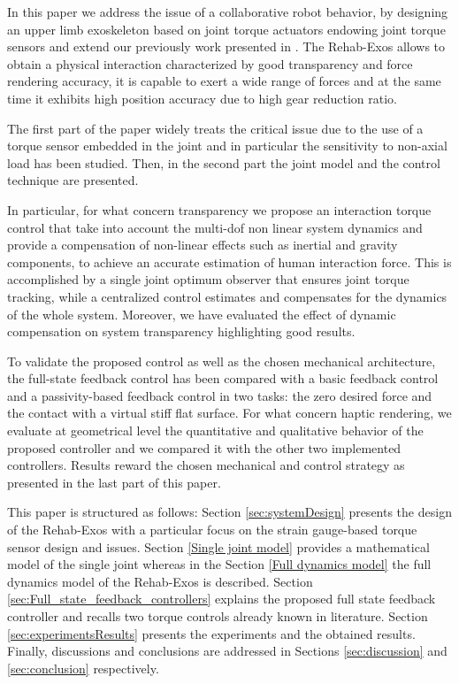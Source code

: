 \par In this paper we address the issue of a collaborative robot behavior, by designing an upper limb exoskeleton based on joint torque actuators endowing joint torque sensors and extend our previously work presented in \cite{solazzi2014interaction}. 
The Rehab-Exos allows to obtain a physical interaction characterized by good transparency and force rendering accuracy, it is capable to exert a wide range of forces and at the same time it exhibits high position accuracy due to high gear reduction ratio.
\par The first part of the paper widely treats the critical issue due to the use of a torque sensor embedded in the joint and in particular the sensitivity to non-axial load has been studied. Then, in the second part the joint model and the control technique are presented.
\par In particular, for what concern transparency we propose an interaction torque control that take into account the multi-dof non linear system dynamics and provide a compensation of non-linear effects such as inertial and gravity components, to achieve an accurate estimation of human interaction force.
This is accomplished by a single joint optimum observer that ensures joint torque tracking, while a centralized control estimates and compensates for the dynamics of the whole system. Moreover, we have evaluated the effect of dynamic compensation on system transparency highlighting good results.
\par To validate the proposed control as well as the chosen mechanical architecture, the full-state feedback control  has been compared with a basic feedback control and a passivity-based feedback control in two tasks: the zero desired force and the contact with a virtual stiff flat surface. 
For what concern haptic rendering, we evaluate at geometrical level the quantitative and qualitative behavior of the proposed controller and we compared it with the other two implemented controllers.
Results reward the chosen mechanical and control strategy as presented in the last part of this paper.
 
\par This paper is structured as follows: Section \ref{sec:systemDesign} presents the design of the Rehab-Exos with a particular focus on the strain gauge-based torque sensor design and issues. Section \ref{Single joint model} provides a mathematical model of the single joint whereas in the Section \ref{Full dynamics model} the full dynamics model of the Rehab-Exos is described. Section \ref{sec:Full_state_feedback_controllers} explains the proposed full state feedback controller and recalls two torque controls already known in literature. Section \ref{sec:experimentsResults} presents the experiments and the obtained results.
Finally, discussions and conclusions are addressed in Sections \ref{sec:discussion} and \ref{sec:conclusion} respectively.  

